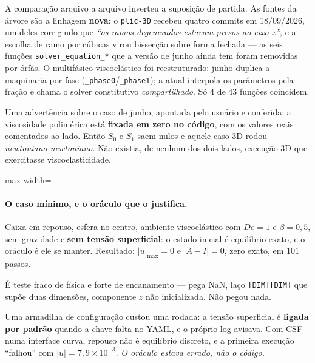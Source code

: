 A compara\c{c}\~ao arquivo a arquivo inverteu a suposi\c{c}\~ao de partida. As
fontes da \'arvore s\~ao a linhagem \textbf{nova}: o \texttt{plic-3D} recebeu
quatro commits em 18/09/2026, um deles corrigindo que \emph{``os ramos
degenerados estavam presos ao eixo x''}, e a escolha de ramo por c\'ubicas virou
bissec\c{c}\~ao sobre forma fechada --- as seis fun\c{c}\~oes \texttt{solver\_equation\_*}
que a vers\~ao de junho ainda tem foram removidas por \'orf\~as. O
multif\'asico viscoel\'astico foi reestruturado: junho duplica a maquinaria por
fase (\texttt{\_phase0}/\texttt{\_phase1}); a atual interpola os par\^ametros pela
fra\c{c}\~ao e chama o solver constitutivo \emph{compartilhado}. S\'o $4$ de $43$
fun\c{c}\~oes coincidem.

Uma advert\^encia sobre o caso de junho, apontada pelo usu\'ario e conferida: a
viscosidade polim\'erica est\'a \textbf{fixada em zero no c\'odigo}, com os
valores reais comentados ao lado. Ent\~ao $S_0$ e $S_1$ saem nulos e aquele caso
3D rodou \emph{newtoniano-newtoniano}. N\~ao existia, de nenhum dos dois lados,
execu\c{c}\~ao 3D que exercitasse viscoelasticidade.

\begin{adjustbox}{max width=\linewidth}
\end{adjustbox}

\paragraph{O caso m\'inimo, e o or\'aculo que o justifica.} Caixa em repouso,
esfera no centro, ambiente viscoel\'astico com $De=1$ e $\beta=0{,}5$, sem
gravidade e \textbf{sem tens\~ao superficial}: o estado inicial \'e equil\'ibrio
exato, e o or\'aculo \'e ele se manter. Resultado: $|u|_{\max}=0$ e
$|A-I|=0$, zero exato, em $101$ passos.

\'E teste fraco de f\'isica e forte de encanamento --- pega NaN, la\c{c}o
\texttt{[DIM][DIM]} que sup\~oe duas dimens\~oes, componente $z$ n\~ao
inicializada. N\~ao pegou nada.

Uma armadilha de configura\c{c}\~ao custou uma rodada: a tens\~ao superficial \'e
\textbf{ligada por padr\~ao} quando a chave falta no YAML, e o pr\'oprio log
avisava. Com CSF numa interface curva, repouso n\~ao \'e equil\'ibrio discreto, e
a primeira execu\c{c}\~ao ``falhou'' com $|u|=7{,}9\times10^{-3}$. \emph{O
or\'aculo estava errado, n\~ao o c\'odigo.}

